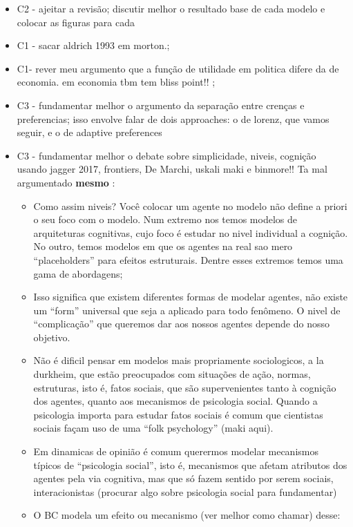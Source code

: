 \documentclass{article}
\begin{document}
\begin{itemize}
\item {\Large C2 - ajeitar a revisão; discutir melhor o resultado base de cada
    modelo e colocar as figuras para cada}
\item {\Large C1 - sacar aldrich 1993 em morton.};
\item {\Large  C1- rever meu argumento que a função de utilidade em politica
    difere da de economia. em economia tbm tem bliss point!! };
\item {\Large C3 - fundamentar melhor o argumento da separação entre crenças e
    preferencias; isso envolve falar de dois approaches: o de lorenz, que vamos
    seguir, e  o de adaptive preferences}
\item {\Large C3 - fundamentar melhor o debate sobre simplicidade, niveis,
    cognição usando jagger 2017, frontiers, De Marchi, uskali maki e binmore!!
    Ta mal argumentado \textbf{mesmo} }:
  \begin{itemize}
  \item Como assim niveis? Você colocar um agente no modelo não define a priori
    o seu foco com o modelo. Num extremo nos temos modelos de arquiteturas
    cognitivas, cujo foco é estudar no nivel individual a cognição. No outro,
    temos modelos em que os agentes na real sao mero ``placeholders'' para
    efeitos estruturais. Dentre esses extremos temos uma gama de abordagens;
  \item Isso significa que existem diferentes formas de modelar agentes, não
    existe um ``form'' universal que seja a aplicado para todo fenômeno. O nivel
    de ``complicação'' que queremos dar aos nossos agentes depende do nosso
    objetivo.
  \item Não é dificil pensar em modelos mais propriamente sociologicos, a la
    durkheim, que estão preocupados com situações de ação, normas, estruturas,
    isto é, fatos sociais, que são supervenientes tanto à cognição dos agentes,
    quanto aos mecanismos de psicologia social. Quando a psicologia importa para
    estudar fatos sociais é comum que cientistas sociais façam uso de uma ``folk
    psychology'' (maki aqui).
  \item Em dinamicas de opinião é comum querermos modelar mecanismos típicos de
    ``psicologia social'', isto é, mecanismos que afetam atributos dos agentes
    pela via cognitiva, mas que só fazem sentido por serem sociais,
    interacionistas (procurar algo sobre psicologia social para fundamentar)
  \item O BC modela um efeito ou mecanismo (ver melhor como chamar) desse:

\end{itemize}
\end{itemize}
\end{document}
